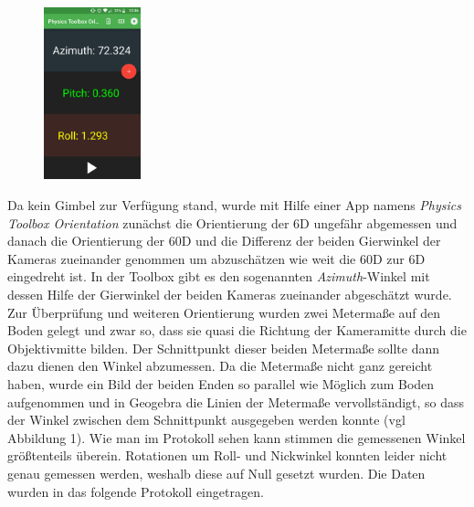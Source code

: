 \begin{figure}
	\centering
	\includegraphics[width=0.25\textwidth]{Images/1_6D_Orientation_PT.png}
\end{figure}	
Da kein Gimbel zur Verfügung stand, wurde mit Hilfe einer App namens \textit{Physics Toolbox Orientation} zunächst die Orientierung der 6D ungefähr abgemessen und danach die Orientierung der 60D und die Differenz der beiden Gierwinkel der Kameras zueinander genommen um abzuschätzen wie weit die 60D zur 6D eingedreht ist. In der Toolbox gibt es den sogenannten \textit{Azimuth}-Winkel mit dessen Hilfe der Gierwinkel der beiden Kameras zueinander abgeschätzt wurde. Zur Überprüfung und weiteren Orientierung wurden zwei Metermaße auf den Boden gelegt und zwar so, dass sie quasi die Richtung der Kameramitte durch die Objektivmitte bilden. Der Schnittpunkt dieser beiden Metermaße sollte dann dazu dienen den Winkel abzumessen. Da die Metermaße nicht ganz gereicht haben, wurde ein Bild der beiden Enden so parallel wie Möglich zum Boden aufgenommen und in Geogebra die Linien der Metermaße vervollständigt, so dass der Winkel zwischen dem Schnittpunkt ausgegeben werden konnte (vgl Abbildung 1). Wie man im Protokoll sehen kann stimmen die gemessenen Winkel größtenteils überein. Rotationen um Roll- und Nickwinkel konnten leider nicht genau gemessen werden, weshalb diese auf Null gesetzt wurden. Die Daten wurden in das folgende Protokoll eingetragen.	



